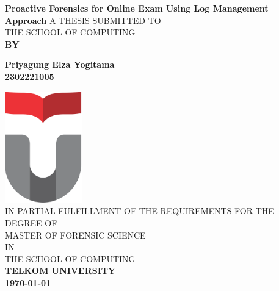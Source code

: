 \begin{titlepage}
\begin{center}
	\LARGE %
    {\sf\singlespacing 
		\textbf{Proactive Forensics for Online Exam Using Log Management Approach 
	}
    \vfill
	\vfill
    \large
    { 
    	A THESIS SUBMITTED TO\\[0.2cm]
    	THE SCHOOL OF COMPUTING\\     
    }
	\vfill
    \sf\textbf{BY\\[0.5cm]}\par
    \large
    \textbf{Priyagung Elza Yogitama\\[0.5cm]2302221005}\par
    \vfill
    \includegraphics[width=0.25\textwidth]{logo/TelkomUniversity}\\[1.5cm] 
    \vfill 
    \normalfont\large
    { 
		IN PARTIAL FULFILLMENT OF THE REQUIREMENTS FOR THE DEGREE OF\\
        MASTER OF FORENSIC SCIENCE\\
        IN\\
        THE SCHOOL OF COMPUTING\\
    }    
    \vfill
    \Large
	\sf\textbf{TELKOM UNIVERSITY}\\
	\sf\textbf{\myyear \today}}
\end{center}
\end{titlepage}

